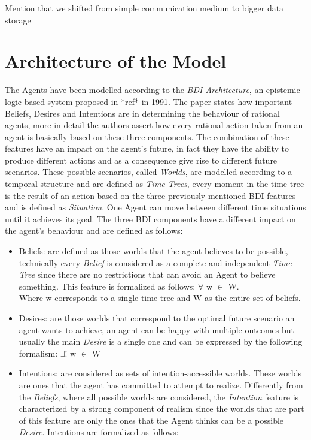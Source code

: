 \documentclass[a4paper]{article}
\begin{document}
Mention that we shifted from simple communication medium to bigger data storage

\section{Architecture of the Model}

The Agents have been modelled according to the \textit{BDI Architecture}, an epistemic logic based system proposed in *ref* in 1991. The paper states how important Beliefs, Desires and Intentions are in determining the behaviour of rational agents, more in detail the authors assert how every rational action taken from an agent is basically based on these three components. The combination of these features have an impact on the agent's future, in fact they have the ability to produce different actions and as a consequence give rise to different future scenarios. These possible scenarios, called \textit{Worlds}, are modelled according to a temporal structure and are defined as \textit{Time Trees}, every moment in the time tree is the result of an action based on the three previously mentioned BDI features and is defined as \textit{Situation}. One Agent can move between different time situations until it achieves its goal. The three BDI components have a different impact on the agent's behaviour and are defined as follows: 

\begin{itemize}

\item Beliefs: are defined as those worlds that the agent believes to be possible, technically every \textit{Belief} is considered as a complete and independent \textit{Time Tree} since there are no restrictions that can avoid an Agent to believe something. This feature is formalized as follows: $\forall$ w $\in$ W. \\
Where w corresponds to a single time tree and W as the entire set of beliefs. 
\item Desires: are those worlds that correspond to the optimal future scenario an agent wants to achieve, an agent can be happy with multiple outcomes but usually the main \textit{Desire} is a single one and can be expressed by the following formalism: $\exists!$ w $\in$ W 
\item Intentions: are considered as sets of intention-accessible worlds. These worlds are ones that the agent has committed to attempt to realize. Differently from the \textit{Beliefs}, where all possible worlds are considered, the \textit{Intention} feature is characterized by a strong component of realism since the worlds that are part of this feature are only the ones that the Agent thinks can be a possible \textit{Desire}. Intentions are formalized as follows:

\end{itemize} 
\end{document}
